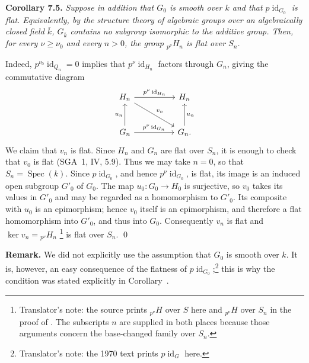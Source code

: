 
\medskip
\noindent{}\textbf{Corollary 7.5.}
\textit{Suppose in addition that \(G_0\) is smooth over \(k\) and that
\(p\operatorname{id}_{G_0}\) is flat. Equivalently, by the structure theory
of algebraic groups over an algebraically closed field \(\overline{k}\),
\(G_{\overline{k}}\) contains no subgroup isomorphic to the additive group.
Then, for every \(\nu\geq\nu_0\) and every \(n>0\), the group
\({}_{p^\nu}H_n\) is flat over \(S_n\).}

Indeed, \(p^{\nu_0}\operatorname{id}_{Q_n}=0\) implies that
\(p^\nu\operatorname{id}_{H_n}\) factors through \(G_n\), giving the
commutative diagram
\[
\begin{tikzcd}[column sep=huge,row sep=large]
H_n
  \arrow[r,"p^\nu\operatorname{id}_{H_n}"]
  \arrow[dr,"v_n"]
&
H_n
\\
G_n
  \arrow[u,"u_n"]
  \arrow[r,"p^\nu\operatorname{id}_{G_n}"]
&
G_n
  \arrow[u,"u_n"']
.
\end{tikzcd}
\]
We claim that \(v_n\) is flat. Since \(H_n\) and \(G_n\) are flat over
\(S_n\), it is enough to check that \(v_0\) is flat (SGA~1, IV, 5.9).
Thus we may take \(n=0\), so that \(S_n=\operatorname{Spec}(k)\). Since
\(p\operatorname{id}_{G_0}\), and hence
\(p^\nu\operatorname{id}_{G_0}\), is flat, its image is an induced open
subgroup \(G'_0\) of \(G_0\). The map \(u_0:G_0\to H_0\) is surjective, so
\(v_0\) takes its values in \(G'_0\) and may be regarded as a homomorphism
to \(G'_0\). Its composite with \(u_0\) is an epimorphism; hence \(v_0\)
itself is an epimorphism, and therefore a flat homomorphism into \(G'_0\),
and thus into \(G_0\). Consequently \(v_n\) is flat and
\(\ker v_n={}_{p^\nu}H_n\)%
\begingroup
\renewcommand{\thefootnote}{\(\dagger\)}
\footnote[0]{Translator's note: the source prints
\({}_{p^\nu}H\) over \(S\) here and \({}_{p^\nu}H\) over \(S_n\) in
the proof of . The subscripts \(n\) are supplied in both places
because those arguments concern the base-changed family over \(S_n\).}
\endgroup
is flat over \(S_n\). \qed

\medskip
\noindent{}\textbf{Remark.}
We did not explicitly use the assumption that \(G_0\) is smooth over \(k\).
It is, however, an easy consequence of the flatness of
\(p\operatorname{id}_{G_0}\);\footnote{Translator's note: the 1970 text prints
\(p\operatorname{id}_G\) here.} this is why the
condition was stated explicitly
in Corollary~.

